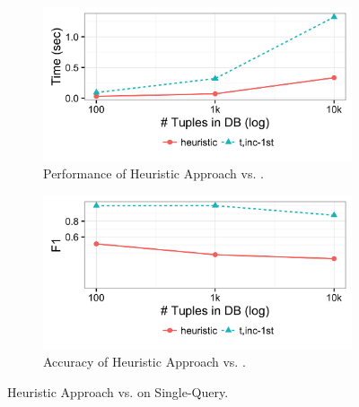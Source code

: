   \begin{figure}[h]
  \centering
    \begin{subfigure}[t]{.23\textwidth}
    \includegraphics[width = .9\columnwidth]{figures/heuristictime}
    \vspace*{-.1in}
    \caption{Performance of Heuristic Approach vs. \sys.}
    \label{f:heuristic_time} 
    \end{subfigure}
    \begin{subfigure}[t]{.23\textwidth}
    \includegraphics[width = .9\columnwidth]{figures/heuristicacc}
    \vspace*{-.1in}
    \caption{Accuracy of Heuristic Approach vs. \sys.}
    \label{f:heuristic_acc} 
    \end{subfigure}
    \vspace*{-.1in}
    \caption{Heuristic Approach vs. \sys on Single-Query. }
  \end{figure}
  
